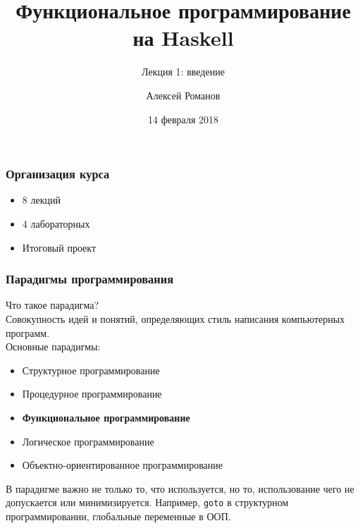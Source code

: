 \documentclass[10pt]{beamer}
\begin{document}
	\author{Алексей Романов}
	\title{Функциональное программирование на Haskell}
	\subtitle{Лекция 1: введение}
	\date{14 февраля 2018}
	\subject{Функциональное программирование на Haskell}
	\begin{frame}[plain]
	\maketitle
\end{frame}

\begin{frame}
\frametitle{Организация курса}
\begin{itemize}
    \item 8 лекций
    \item 4 лабораторных
    \item Итоговый проект
\end{itemize}
\end{frame}

\begin{frame}
\frametitle{Парадигмы программирования}
Что такое парадигма? \\
\pause
\hspace*{20pt} Совокупность идей и понятий, определяющих стиль написания компьютерных программ. \\
\pause
Основные парадигмы: \\
\pause
\begin{itemize}
    \item Структурное программирование
    \item Процедурное программирование
    \item \textbf{Функциональное программирование}
    \item Логическое программирование
    \item Объектно-ориентированное программирование
\end{itemize}
\pause
В парадигме важно не только то, что используется, но то, использование чего не допускается или минимизируется.
\pause
Например, \lstinline!goto! в структурном программировании, глобальные переменные в ООП.
\end{frame}
\end{document}
